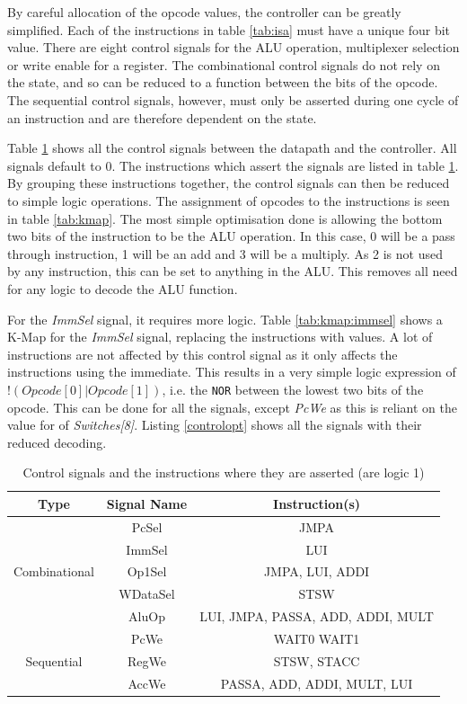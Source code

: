 By careful allocation of the opcode values, the controller can be greatly simplified. 
Each of the instructions in table \ref{tab:isa} must have a unique four bit value. 
There are eight control signals for the ALU operation, multiplexer selection or write enable for a register. 
The combinational control signals do not rely on the state, and so can be reduced to a function between the bits of the opcode. 
The sequential control signals, however, must only be asserted during one cycle of an instruction and are therefore dependent on the state. 

Table \ref{tab:controlsignals} shows all the control signals between the datapath and the controller. 
All signals default to 0.
The instructions which assert the signals are listed in table \ref{tab:controlsignals}. 
By grouping these instructions together, the control signals can then be reduced to simple logic operations.
The assignment of opcodes to the instructions is seen in table \ref{tab:kmap}. 
The most simple optimisation done is allowing the bottom two bits of the instruction to be the ALU operation. 
In this case, 0 will be a pass through instruction, 1 will be an add and 3 will be a multiply. 
As 2 is not used by any instruction, this can be set to anything in the ALU.
This removes all need for any logic to decode the ALU function. 

For the \textit{ImmSel} signal, it requires more logic. 
Table \ref{tab:kmap:immsel} shows a K-Map for the \textit{ImmSel} signal, replacing the instructions with values.
A lot of instructions are not affected by this control signal as it only affects the instructions using the immediate. 
This results in a very simple logic expression of $!(Opcode[0] | Opcode[1])$, i.e. the \texttt{NOR} between the lowest two bits of the opcode. 
This can be done for all the signals, except \textit{PcWe} as this is reliant on the value for of \textit{Switches[8]}. 
Listing \ref{controlopt} shows all the signals with their reduced decoding. 

\begin{table}
\caption{Control signals and the instructions where they are asserted (are logic 1)}
\label{tab:controlsignals}
\centering
\begin{tabular}{ccc} \toprule
Type & Signal Name & Instruction(s) \\ \midrule
\multirow{5}{*}{Combinational} & PcSel & JMPA \\ 
 & ImmSel & LUI \\
 & Op1Sel & JMPA, LUI, ADDI \\
 & WDataSel & STSW \\ 
 & AluOp & LUI, JMPA, PASSA, ADD, ADDI, MULT \\ \midrule
\multirow{3}{*}{Sequential} & PcWe & WAIT0 WAIT1 \\
 & RegWe & STSW, STACC \\
 & AccWe &  PASSA, ADD, ADDI, MULT, LUI \\ \bottomrule

\end{tabular}
\end{table}

